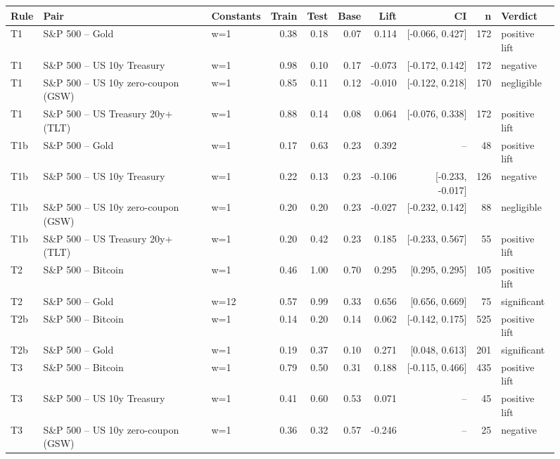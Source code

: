 \begin{figure}
\centering
\begin{tabular}{lllrrrrrrl}
\toprule
Rule & Pair & Constants & Train & Test & Base & Lift & CI & n & Verdict \\
\midrule
T1 & S\&P 500 -- Gold & w=1 & 0.38 & 0.18 & 0.07 & 0.114 & [-0.066, 0.427] & 172 & positive lift \\
T1 & S\&P 500 -- US 10y Treasury & w=1 & 0.98 & 0.10 & 0.17 & -0.073 & [-0.172, 0.142] & 172 & negative \\
T1 & S\&P 500 -- US 10y zero-coupon (GSW) & w=1 & 0.85 & 0.11 & 0.12 & -0.010 & [-0.122, 0.218] & 170 & negligible \\
T1 & S\&P 500 -- US Treasury 20y+ (TLT) & w=1 & 0.88 & 0.14 & 0.08 & 0.064 & [-0.076, 0.338] & 172 & positive lift \\
T1b & S\&P 500 -- Gold & w=1 & 0.17 & 0.63 & 0.23 & 0.392 & -- & 48 & positive lift \\
T1b & S\&P 500 -- US 10y Treasury & w=1 & 0.22 & 0.13 & 0.23 & -0.106 & [-0.233, -0.017] & 126 & negative \\
T1b & S\&P 500 -- US 10y zero-coupon (GSW) & w=1 & 0.20 & 0.20 & 0.23 & -0.027 & [-0.232, 0.142] & 88 & negligible \\
T1b & S\&P 500 -- US Treasury 20y+ (TLT) & w=1 & 0.20 & 0.42 & 0.23 & 0.185 & [-0.233, 0.567] & 55 & positive lift \\
T2 & S\&P 500 -- Bitcoin & w=1 & 0.46 & 1.00 & 0.70 & 0.295 & [0.295, 0.295] & 105 & positive lift \\
T2 & S\&P 500 -- Gold & w=12 & 0.57 & 0.99 & 0.33 & 0.656 & [0.656, 0.669] & 75 & significant \\
T2b & S\&P 500 -- Bitcoin & w=1 & 0.14 & 0.20 & 0.14 & 0.062 & [-0.142, 0.175] & 525 & positive lift \\
T2b & S\&P 500 -- Gold & w=1 & 0.19 & 0.37 & 0.10 & 0.271 & [0.048, 0.613] & 201 & significant \\
T3 & S\&P 500 -- Bitcoin & w=1 & 0.79 & 0.50 & 0.31 & 0.188 & [-0.115, 0.466] & 435 & positive lift \\
T3 & S\&P 500 -- US 10y Treasury & w=1 & 0.41 & 0.60 & 0.53 & 0.071 & -- & 45 & positive lift \\
T3 & S\&P 500 -- US 10y zero-coupon (GSW) & w=1 & 0.36 & 0.32 & 0.57 & -0.246 & -- & 25 & negative \\

\end{tabular}
\end{figure}
